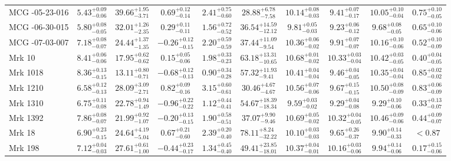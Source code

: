 \documentclass[onecolumn]{mn2e}
\begin{document}
\begin{landscape}
{\begin{center}
\begin{longtable}{lccccccccc}
MCG -05-23-016 & $5.43_{-0.06}^{+0.09}$ & $39.66_{-3.71}^{+1.95}$ & $0.69_{-0.14}^{+0.12}$ & $2.41_{-0.60}^{+0.75}$ &$28.88_{-7.58}^{+6.78}$ & $10.14_{-0.03}^{+0.08}$ & $9.41_{-0.17}^{+0.07}$ & $10.05_{-0.04}^{+0.10}$ & $0.75_{-0.05}^{+0.10}$ \\
MCG -06-30-015 & $5.80_{-0.05}^{+0.08}$ & $32.01_{-2.35}^{+1.26}$ & $0.29_{-0.11}^{+0.11}$ & $1.56_{-0.52}^{+0.72}$ &$36.54_{-12.12}^{+14.59}$ & $9.81_{-0.03}^{+0.05}$ & $9.23_{-0.12}^{+0.06}$ & $9.68_{-0.05}^{+0.08}$ & $0.65_{-0.06}^{+0.10}$ \\
MCG -07-03-007 & $7.18_{-0.07}^{+0.08}$ & $24.44_{-1.35}^{+1.37}$ & $-0.26_{-0.15}^{+0.12}$ & $2.20_{-0.59}^{+0.59}$ &$37.44_{-9.54}^{+11.09}$ & $10.36_{-0.02}^{+0.06}$ & $9.91_{-0.07}^{+0.07}$ & $10.16_{-0.06}^{+0.10}$ & $0.52_{-0.09}^{+0.10}$ \\
Mrk 10 & $8.41_{-0.06}^{+0.06}$ & $17.95_{-0.62}^{+0.62}$ & $0.15_{-0.06}^{+0.05}$ & $1.98_{-0.23}^{+0.33}$ &$63.18_{-10.65}^{+13.31}$ & $10.68_{-0.02}^{+0.01}$ & $10.33_{-0.04}^{+0.03}$ & $10.42_{-0.05}^{+0.03}$ & $0.40_{-0.05}^{+0.04}$ \\
Mrk 1018 & $8.36_{-0.15}^{+0.13}$ & $13.11_{-0.71}^{+0.80}$ & $-0.68_{-0.13}^{+0.12}$ & $0.90_{-0.28}^{+0.34}$ &$57.32_{-9.41}^{+11.93}$ & $10.41_{-0.04}^{+0.04}$ & $9.46_{-0.05}^{+0.04}$ & $10.35_{-0.04}^{+0.04}$ & $0.85_{-0.02}^{+0.02}$ \\
Mrk 1210 & $6.58_{-0.13}^{+0.12}$ & $28.09_{-2.71}^{+3.09}$ & $0.82_{-0.16}^{+0.09}$ & $3.15_{-0.61}^{+0.60}$ &$30.46_{-4.67}^{+4.67}$ & $10.56_{-0.06}^{+0.07}$ & $9.67_{-0.15}^{+0.15}$ & $10.50_{-0.09}^{+0.08}$ & $0.83_{-0.09}^{+0.06}$ \\
Mrk 1310 & $6.75_{-0.08}^{+0.11}$ & $22.78_{-1.49}^{+0.94}$ & $-0.96_{-0.22}^{+0.22}$ & $1.12_{-0.41}^{+0.44}$ &$54.67_{-18.34}^{+18.39}$ & $9.59_{-0.02}^{+0.03}$ & $9.29_{-0.08}^{+0.04}$ & $9.29_{-0.06}^{+0.10}$ & $0.33_{-0.07}^{+0.13}$ \\
Mrk 1392 & $7.86_{-0.07}^{+0.08}$ & $21.99_{-1.07}^{+0.92}$ & $-0.20_{-0.15}^{+0.13}$ & $1.90_{-0.51}^{+0.58}$ &$37.07_{-9.46}^{+9.90}$ & $10.69_{-0.02}^{+0.05}$ & $10.32_{-0.05}^{+0.04}$ & $10.46_{-0.06}^{+0.09}$ & $0.44_{-0.07}^{+0.09}$ \\
Mrk 18 & $6.90_{-0.15}^{+0.23}$ & $24.64_{-5.04}^{+4.19}$ & $0.67_{-0.60}^{+0.21}$ & $2.39_{-0.40}^{+0.20}$ &$78.11_{-32.22}^{+8.24}$ & $10.10_{-0.03}^{+0.03}$ & $9.65_{-0.37}^{+0.26}$ & $9.90_{-0.33}^{+0.14}$ & $<0.87$ \\
Mrk 198 & $7.12_{-0.03}^{+0.04}$ & $27.61_{-1.00}^{+0.61}$ & $-0.44_{-0.17}^{+0.23}$ & $1.34_{-0.40}^{+0.45}$ &$49.41_{-18.01}^{+23.85}$ & $10.37_{-0.01}^{+0.04}$ & $10.16_{-0.06}^{+0.03}$ & $9.94_{-0.06}^{+0.14}$ & $0.17_{-0.06}^{+0.15}$ \\

\end{longtable}
\end{center}}
\end{landscape}
\end{document}
